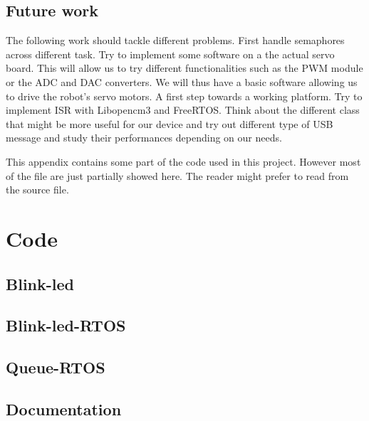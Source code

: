 \documentclass[12pt,a4paper]{report}
\begin{document}
\section{Future work}
\label{sec:future}
The following work should tackle different problems.\newline
First handle semaphores across different task.\newline
Try to implement some software on a the actual servo board. This will allow us to try different functionalities such as the PWM module or the ADC and DAC converters. We will thus have a basic software allowing us to drive the robot's servo motors. A first step towards a working platform.\newline
Try to implement ISR with Libopencm3 and FreeRTOS.\newline
Think about the different class that might be more useful for our device and try out different type of USB message and study their performances depending on our needs. 
\begin{appendices}
This appendix contains some part of the code used in this project. However most of the file are just partially showed here. The reader might prefer to read from the source file.
\chapter{Code}
\section{Blink-led}


\section{Blink-led-RTOS}


\section{Queue-RTOS}

\section{Documentation}




\end{appendices}
 

\end{document}
